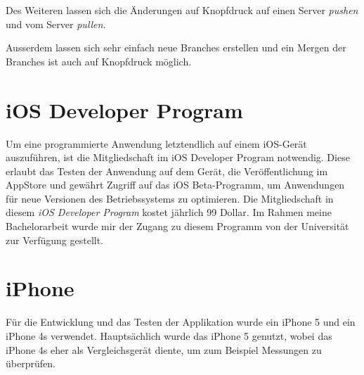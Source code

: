 Des Weiteren lassen sich die Änderungen auf Knopfdruck auf einen Server \emph{pushen} und vom Server \emph{pullen}.

Ausserdem lassen sich sehr einfach neue Branches erstellen und ein Mergen der Branches ist auch auf Knopfdruck möglich.


\section{iOS Developer Program}
\label{sec:iosdevprogram}
Um eine programmierte Anwendung letztendlich auf einem iOS-Gerät auszuführen, ist die Mitgliedschaft im iOS Developer Program notwendig.
Diese erlaubt das Testen der Anwendung auf dem Gerät, die Veröffentlichung im AppStore und gewährt Zugriff auf das iOS Beta-Programm, um Anwendungen für neue Versionen des Betriebssystems zu optimieren.
Die Mitgliedschaft in diesem \emph{iOS Developer Program} kostet jährlich 99 Dollar. 
Im Rahmen meine Bachelorarbeit wurde mir der Zugang zu diesem Programm von der Universität zur Verfügung gestellt.



\section{iPhone}
\label{sec:tools:iphone}
Für die Entwicklung und das Testen der Applikation wurde ein iPhone 5 und ein iPhone 4s verwendet. 
Hauptsächlich wurde das iPhone 5 genutzt, wobei das iPhone 4s eher als Vergleichsgerät diente, um zum Beispiel Messungen zu überprüfen.


